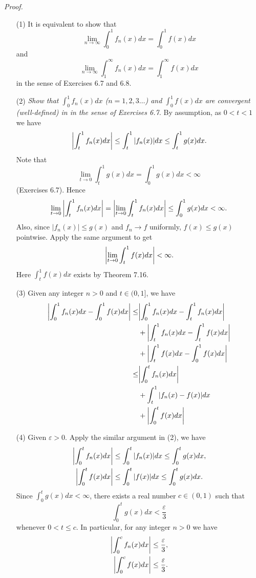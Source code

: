 \documentclass{article}
\begin{document}
\emph{Proof.}
\begin{enumerate}
\item[(1)]
It is equivalent to show that
\[
  \lim_{n \to \infty} \int_{0}^{1} f_n(x)dx = \int_{0}^{1} f(x)dx
\]
and
\[
  \lim_{n \to \infty} \int_{1}^{\infty} f_n(x)dx = \int_{1}^{\infty} f(x)dx
\]
in the sense of Exercises 6.7 and 6.8.

\item[(2)]
\emph{Show that $\int_{0}^{1} f_n(x)dx$ ($n=1,2,3\ldots$) and $\int_{0}^{1} f(x)dx$ are
convergent (well-defined) in in the sense of Exercises 6.7.}
By assumption, as $0 < t < 1$ we have
\[
  \abs{\int_{t}^{1} f_n(x)dx}
  \leq \int_{t}^{1} \abs{f_n(x)}dx
  \leq \int_{t}^{1} g(x)dx.
\]
Note that
\[
  \lim_{t \to 0} \int_{t}^{1} g(x)dx = \int_{0}^{1} g(x)dx < \infty
\]
(Exercises 6.7).
Hence
\[
  \lim_{t \to 0}\abs{\int_{t}^{1} f_n(x)dx}
  = \abs{\lim_{t \to 0} \int_{t}^{1} f_n(x)dx}
  \leq \int_{0}^{1} g(x)dx
  < \infty.
\]
Also,
since $|f_n(x)| \leq g(x)$ and $f_n \to f$ uniformly, $f(x) \leq g(x)$ pointwise.
Apply the same argument to get
\[
  \abs{\lim_{t \to 0} \int_{t}^{1} f(x)dx}
  < \infty.
\]
Here $\int_{t}^{1} f(x)dx$ exists by Theorem 7.16.

\item[(3)]
Given any integer $n > 0$ and $t \in (0,1]$, we have
\begin{align*}
  \abs{ \int_{0}^{1} f_n(x)dx - \int_{0}^{1} f(x)dx }
  \leq&
  \abs{ \int_{0}^{1} f_n(x)dx - \int_{t}^{1} f_n(x)dx } \\
    &+ \abs{ \int_{t}^{1} f_n(x)dx - \int_{t}^{1} f(x)dx } \\
    &+ \abs{ \int_{t}^{1} f(x)dx - \int_{0}^{1} f(x)dx } \\
  \leq&
  \abs{ \int_{0}^{t} f_n(x)dx } \\
    &+ \int_{t}^{1} \abs{ f_n(x) - f(x) } dx \\
    &+ \abs{ \int_{0}^{t} f(x)dx } \\
\end{align*}

\item[(4)]
Given $\varepsilon > 0$.
Apply the similar argument in (2),
we have
\begin{align*}
  \abs{ \int_{0}^{t} f_n(x)dx }
  &\leq \int_{0}^{t} |f_n(x)|dx
  \leq \int_{0}^{t} g(x)dx, \\
  \abs{ \int_{0}^{t} f(x)dx }
  &\leq \int_{0}^{t} |f(x)|dx
  \leq \int_{0}^{t} g(x)dx.
\end{align*}
Since $\int_{0}^{t} g(x)dx < \infty$,
there exists a real number $c \in (0,1)$ such that
\[
  \int_{0}^{t} g(x)dx < \frac{\varepsilon}{3}
\]
whenever $0 < t \leq c$.
In particular, for any integer $n > 0$ we have
\begin{align*}
  \abs{ \int_{0}^{c} f_n(x)dx }
  &\leq \frac{\varepsilon}{3}, \\
  \abs{ \int_{0}^{c} f(x)dx }
  &\leq \frac{\varepsilon}{3}.
\end{align*}


\end{enumerate}
\end{document}
